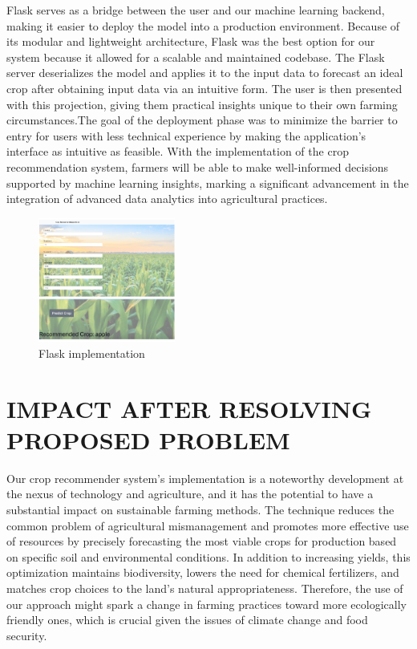 Flask serves as a bridge between the user and our machine learning backend, making it easier to deploy the model into a production environment. Because of its modular and lightweight architecture, Flask was the best option for our system because it allowed for a scalable and maintained codebase. The Flask server deserializes the model and applies it to the input data to forecast an ideal crop after obtaining input data via an intuitive form. The user is then presented with this projection, giving them practical insights unique to their own farming circumstances.The goal of the deployment phase was to minimize the barrier to entry for users with less technical experience by making the application's interface as intuitive as feasible. With the implementation of the crop recommendation system, farmers will be able to make well-informed decisions supported by machine learning insights, marking a significant advancement in the integration of advanced data analytics into agricultural practices.

 \begin{figure}[h]
    \centering
    \includegraphics[width=0.4\textwidth]{visual 6.png}
    \caption{Flask implementation}
    \label{fig:my_label}

\end{figure}

\section{IMPACT AFTER RESOLVING PROPOSED PROBLEM}
Our crop recommender system's implementation is a noteworthy development at the nexus of technology and agriculture, and it has the potential to have a substantial impact on sustainable farming methods. The technique reduces the common problem of agricultural mismanagement and promotes more effective use of resources by precisely forecasting the most viable crops for production based on specific soil and environmental conditions. In addition to increasing yields, this optimization maintains biodiversity, lowers the need for chemical fertilizers, and matches crop choices to the land's natural appropriateness. Therefore, the use of our approach might spark a change in farming practices toward more ecologically friendly ones, which is crucial given the issues of climate change and food security.

